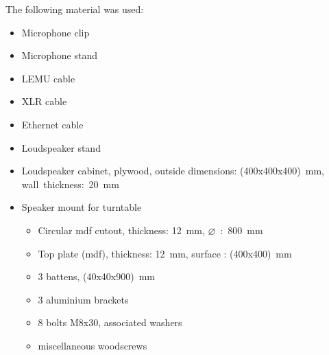 The following material was used:
\begin{itemize}[noitemsep]
\item Microphone clip
\item Microphone stand
\item LEMU cable
\item XLR cable
\item Ethernet cable
\item Loudspeaker stand
\item Loudspeaker cabinet, plywood, outside dimensions: (400x400x400)\SI{}{\milli\meter}, wall~thickness:~\SI{20}{\milli\meter}
\item Speaker mount for turntable
\begin{itemize}[noitemsep]
\item Circular \gls{mdf} cutout, thickness: \SI{12}{\milli\meter}, {\(\varnothing\)~:~\SI{800}{\milli\meter}}
\item Top plate (\gls{mdf}), thickness: \SI{12}{\milli\meter}, surface : (400x400)\SI{}{\milli\meter}
\item 3 battens, (40x40x900)\SI{}{\milli\meter}
\item 3 aluminium brackets
\item 8 bolts M8x30, associated washers
\item miscellaneous woodscrews

\end{itemize}
\end{itemize}

